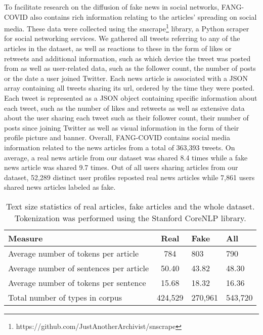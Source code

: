 \documentclass[11pt]{article}
\begin{document}
To facilitate research on the diffusion of fake news in social networks, FANG-COVID also contains rich information relating to the articles' spreading on social media. These data were collected using the snscrape\footnote{https://github.com/JustAnotherArchivist/snscrape} library, a Python scraper for social networking services. We gathered all  tweets referring to any of the articles in the dataset, as well as reactions to these in the form of likes or retweets and additional information, such as which device the tweet was posted from as well as user-related data, such as the follower count, the number of posts or the date a user joined Twitter. Each news article is associated with a JSON array containing all tweets sharing its url, ordered by the time they were posted. Each tweet is represented as a JSON object containing specific information about each tweet, such as the number of likes and retweets as well as extensive data about the user sharing each tweet such as their follower count, their number of posts since joining Twitter as well as visual information in the form of their profile picture and banner. Overall, FANG-COVID contains social media information related to the news articles from a total of 363,393 tweets. On average, a real news article from our dataset was shared 8.4 times while a fake news article was shared 9.7 times. Out of all users sharing articles from our dataset, 52,289 distinct user profiles reposted real news articles while 7,861 users shared news articles labeled as fake.

\begin{table*}
\centering
\caption{Text size statistics of real articles, fake articles and the whole dataset. Tokenization was performed using the Stanford CoreNLP library.}
\begin{tabular}{lcfa}
\hline
\textbf{Measure} & \textbf{Real} &  \textbf{Fake} & \textbf{All}\\
\hline
{Average number of tokens per article} & {784} & {803} & {790} \\
{Average number of sentences per article} & {50.40} & {43.82} & {48.30} \\ 
{Average number of tokens per sentence} & {15.68} & {18.32} & {16.36} \\
{Total number of types in corpus} & {424,529} & {270,961} & {543,720} \\ 
\hline
\end{tabular}

\label{tab:corpusstats}
\end{table*}
\end{document}
